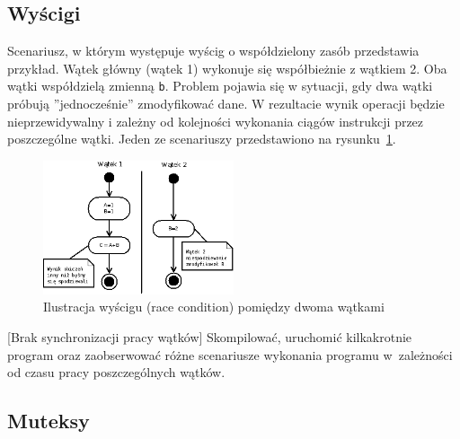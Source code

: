 \subsection{Wyścigi}

Scenariusz, w którym występuje wyścig o współdzielony zasób przedstawia przykład. Wątek główny (wątek 1) wykonuje się współbieżnie z wątkiem 2. Oba wątki współdzielą zmienną \lstinline[style=MyCStyle]{b}. Problem pojawia się w sytuacji, gdy dwa wątki próbują ''jednocześnie'' zmodyfikować dane. W rezultacie wynik operacji będzie nieprzewidywalny i zależny od kolejności wykonania ciągów instrukcji przez poszczególne wątki. Jeden ze scenariuszy przedstawiono na rysunku~\ref{fig:I6GXX}.


\begin{figure}[!h]
\centering
\includegraphics[width=0.5\textwidth]{img/thrd_race}
\caption{Ilustracja wyścigu (race condition) pomiędzy dwoma wątkami}
\label{fig:I6GXX}
\end{figure}

\begin{example}{[Brak synchronizacji pracy wątków]} \label{ex:AO8BL}
Skompilować, uruchomić kilkakrotnie program oraz zaobserwować różne scenariusze wykonania programu w~zależności od czasu pracy poszczególnych wątków.


\end{example}

\subsection{Muteksy}

